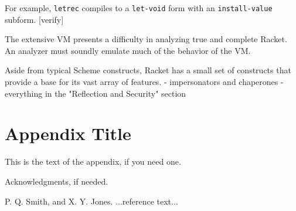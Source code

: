\documentclass[preprint]{sigplanconf}
\begin{document}
For example, \texttt{letrec} compiles to a \texttt{let-void} form with an \texttt{install-value} subform. [verify]

The extensive VM presents a difficulty in analyzing true and complete Racket. An analyzer must soundly emulate much of the behavior of the VM.

Aside from typical Scheme constructs, Racket has a small set of constructs that provide a base for its vast array of features.
- impersonators and chaperones
- everything in the "Reflection and Security" section

 

\appendix
\section{Appendix Title}

This is the text of the appendix, if you need one.

\acks

Acknowledgments, if needed.





\begin{thebibliography}{}
\softraggedright

P. Q. Smith, and X. Y. Jones. ...reference text...

\end{thebibliography}
\end{document}
